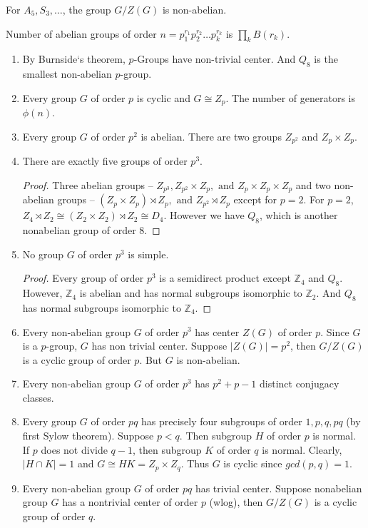 	For $A_5,S_3,\dots$, the group $G/Z(G)$ is non-abelian.

	Number of abelian groups of order $n = p_1^{r_1}p_2^{r_2}\dots p_k^{r_k}$ is $\prod_k B(r_k)$.

\begin{enumerate}
	\item By Burnside`s theorem, $p$-Groups have non-trivial center. And $Q_8$ is the smallest non-abelian $p$-group.
	\item Every group $G$ of order $p$ is cyclic and $G \cong Z_p$. The number of generators is $\phi(n)$.
	\item Every group $G$ of order $p^2$ is abelian. There are two groups $Z_{p^2}$ and $Z_p \times Z_p$.
	\item There are exactly five groups of order $p^3$.
	\begin{proof}
		Three abelian groups -- $Z_{p^3}, Z_{p^2} \times Z_p, \text{ and } Z_p \times Z_p \times Z_p$ and two non-abelian groups -- $(Z_p \times Z_p) \rtimes Z_p, \text{ and } Z_{p^2} \rtimes Z_p$ except for $p =2$. For $p=2$, $Z_4 \rtimes Z_2 \cong (Z_2 \times Z_2) \rtimes Z_2 \cong D_4$. However we have $Q_8$, which is another nonabelian group of order $8$.
	\end{proof}
	\item No group $G$ of order $p^3$ is simple.
	\begin{proof}
		Every group of order $p^3$ is a semidirect product except $\mathbb{Z}_4$ and $Q_8$. However, $\mathbb{Z}_4$ is abelian and has normal subgroups isomorphic to $\mathbb{Z}_2$. And $Q_8$ has normal subgroups isomorphic to $\mathbb{Z}_4$.
	\end{proof}
	\item Every non-abelian group $G$ of order $p^3$ has center $Z(G)$ of order $p$. Since $G$ is a $p$-group, $G$ has non trivial center. Suppose $|Z(G)| = p^2$, then $G/Z(G)$ is a cyclic group of order $p$. But $G$ is non-abelian.
	\item Every non-abelian group $G$ of order $p^3$ has $p^2+p-1$ distinct conjugacy classes.
	\item Every group $G$ of order $pq$ has precisely four subgroups of order $1,p,q,pq$ (by first Sylow theorem).
		Suppose $p<q$.
		Then subgroup $H$ of order $p$ is normal.
		If $p$ does not divide $q-1$, then subgroup $K$ of order $q$ is normal.
		Clearly, $|H \cap K| = 1$ and $G \cong HK = Z_p \times Z_q$.
		Thus $G$ is cyclic since $gcd(p,q)=1$.
	\item Every non-abelian group $G$ of order $pq$ has trivial center. Suppose nonabelian group $G$ has a nontrivial center of order $p$ (wlog), then $G/Z(G)$ is a cyclic group of order $q$.

\end{enumerate}
